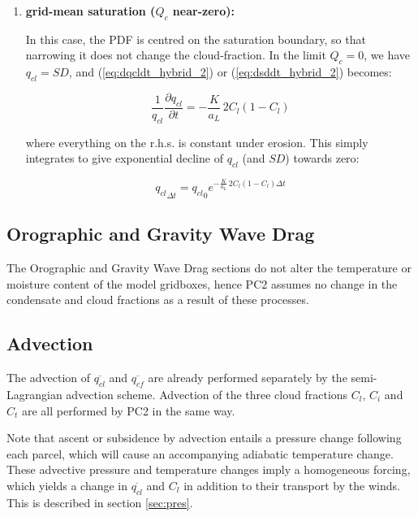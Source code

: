 \documentclass{UMDP_article}
\begin{document}
\begin{enumerate}
\begin{enumerate}
\item {\bf grid-mean saturation ($Q_c$ near-zero):}

In this case, the PDF is centred on the
saturation boundary, so that narrowing it does not change the cloud-fraction.
In the limit $Q_c = 0$, we have $q_{cl} = SD$, and (\ref{eq:dqcldt_hybrid_2})
or (\ref{eq:dsddt_hybrid_2}) becomes:

\begin{equation}
\frac{1}{q_{cl}} \frac{\partial q_{cl}}{\partial t}
  = -\frac{K}{a_L} \, 2 C_l (1 - C_l)
\end{equation}

where everything on the r.h.s. is constant under erosion.
This simply integrates to give exponential decline of $q_{cl}$
(and $SD$) towards zero:

\begin{equation}
{q_{cl}}_{\Delta t} = {q_{cl}}_0 e^{ -\frac{K}{a_L} \, 2 C_l (1 - C_l) \Delta t }
\end{equation}

\end{enumerate}

\end{enumerate}


\subsection{Orographic and Gravity Wave Drag}
The Orographic and Gravity Wave Drag sections do not alter the temperature
or moisture content of the model gridboxes, hence PC2 assumes no change in the
condensate and cloud fractions as a result of these processes.

\subsection{Advection}
\label{sec:advec}

The advection of $\overline{q_{cl}}$ and $\overline{q_{cf}}$ are already
performed separately by the semi-Lagrangian advection scheme.
Advection of the three cloud fractions $C_l$, $C_i$ and $C_t$ are all
performed by PC2 in the same way.

Note that ascent or subsidence by advection entails a pressure change following
each parcel, which will cause an accompanying adiabatic temperature change.
These advective pressure and temperature changes imply a homogeneous forcing,
which yields a change in $\overline{q_{cl}}$ and $C_l$ in addition to their
transport by the winds.  This is described in section \ref{sec:pres}.
\end{document}
